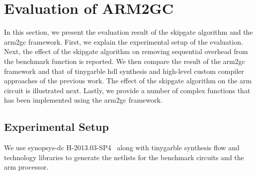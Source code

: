 
\section{Evaluation of ARM2GC}\label{sec:eval-arm2gc}
In this section, we present the evaluation result of the \gls{skipgate} algorithm and the \gls{arm2gc} framework.
First, we explain the experimental setup of the evaluation.
Next, the effect of the \gls{skipgate} algorithm on removing sequential overhead from the benchmark function is reported.
We then compare the result of the \gls{arm2gc} framework and that of \gls{tinygarble} \acrshort{hdl} synthesis and high-level custom compiler approaches of the previous work.
The effect of the \gls{skipgate} algorithm on the \gls{arm} circuit is illustrated next.
Lastly, we provide a number of complex functions that has been implemented using the \gls{arm2gc} framework.

\subsection{Experimental Setup}
We use \gls{synopsys-dc} H-2013.03-SP4~\cite{tool:DesignCompiler} along with \gls{tinygarble} synthesis flow and technology libraries to generate the \gls{netlist}s for the benchmark circuits and the \gls{arm} processor.

